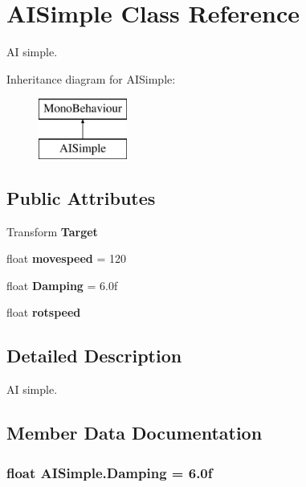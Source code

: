 \section{A\+I\+Simple Class Reference}
\label{class_a_i_simple}


AI simple.  


Inheritance diagram for A\+I\+Simple\+:\begin{figure}[H]
\begin{center}
\leavevmode
\includegraphics[height=2.000000cm]{class_a_i_simple}
\end{center}
\end{figure}
\subsection*{Public Attributes}
\begin{DoxyCompactItemize}
\item 
Transform {\bf Target}
\item 
float {\bf movespeed} = 120
\item 
float {\bf Damping} = 6.\+0f
\item 
float {\bf rotspeed}
\end{DoxyCompactItemize}


\subsection{Detailed Description}
AI simple. 



\subsection{Member Data Documentation}
\subsubsection[{Damping}]{\setlength{\rightskip}{0pt plus 5cm}float A\+I\+Simple.\+Damping = 6.\+0f}\label{class_a_i_simple_aebf2c77052d1c42550c5ae90fafdf3f7}
